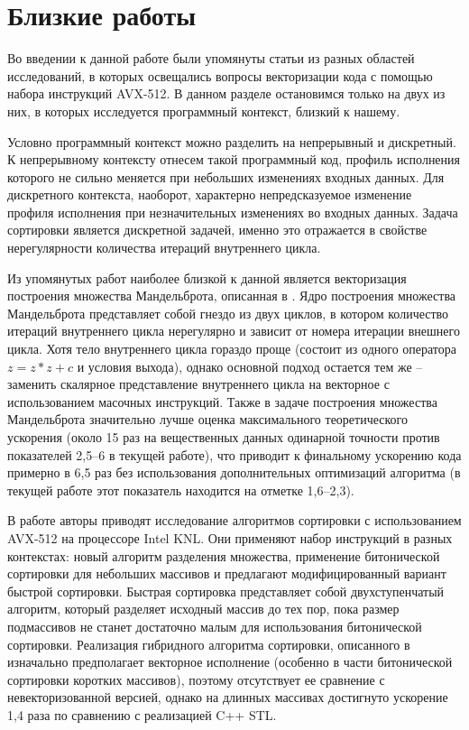\documentclass[utf8]{psta}
\begin{document}
\section{Близкие работы}

Во введении к данной работе были упомянуты статьи из разных областей исследований, в которых освещались вопросы векторизации кода с помощью набора инструкций AVX-512.
В данном разделе остановимся только на двух из них, в которых исследуется программный контекст, близкий к нашему.

Условно программный контекст можно разделить на непрерывный и дискретный.
К непрерывному контексту отнесем такой программный код, профиль исполнения которого не сильно меняется при небольших изменениях входных данных.
Для дискретного контекста, наоборот, характерно непредсказуемое изменение профиля исполнения при незначительных изменениях во входных данных.
Задача сортировки является дискретной задачей, именно это отражается в свойстве нерегулярности количества итераций внутреннего цикла.

Из упомянутых работ наиболее близкой к данной является векторизация построения множества Мандельброта, описанная в \cite{Krzikalla}.
Ядро построения множества Мандельброта представляет собой гнездо из двух циклов, в котором количество итераций внутреннего цикла нерегулярно и зависит от номера итерации внешнего цикла.
Хотя тело внутреннего цикла гораздо проще (состоит из одного оператора $z = z * z + c$ и условия выхода), однако основной подход остается тем же -- заменить скалярное представление внутреннего цикла на векторное с использованием масочных инструкций.
Также в задаче построения множества Мандельброта значительно лучше оценка максимального теоретического ускорения (около 15 раз на вещественных данных одинарной точности против показателей 2,5--6 в текущей работе), что приводит к финальному ускорению кода примерно в 6,5 раз без использования дополнительных оптимизаций алгоритма (в текущей работе этот показатель находится на отметке 1,6--2,3).

В работе \cite{Bramas} авторы приводят исследование алгоритмов сортировки с использованием AVX-512 на процессоре Intel KNL.
Они применяют набор инструкций в разных контекстах: новый алгоритм разделения множества, применение битонической сортировки для небольших массивов и предлагают модифицированный вариант быстрой сортировки.
Быстрая сортировка представляет собой двухступенчатый алгоритм, который разделяет исходный массив до тех пор, пока размер подмассивов не станет достаточно малым для использования битонической сортировки.
Реализация гибридного алгоритма сортировки, описанного в \cite{Bramas} изначально предполагает векторное исполнение (особенно в части битонической сортировки коротких массивов), поэтому отсутствует ее сравнение с невекторизованной версией, однако на длинных массивах достигнуто ускорение 1,4 раза по сравнению с реализацией C++ STL.
\end{document}
